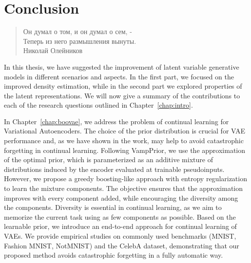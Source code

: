 \chapter{Conclusion}


\begin{quote}
\normalsize\itshape
\begin{flushright}
\foreignlanguage{russian}{Он думал о том, и он думал о сем, -}\\
\foreignlanguage{russian}{Теперь из него размышления вынуты.}  \\
\foreignlanguage{russian}{Николай Олейников} \\ \vskip 10pt
\end{flushright}
\end{quote}

In this thesis, we have suggested the improvement of latent variable generative models in different scenarios and aspects. In the first part, we focused on the improved density estimation, while in the second part we explored properties of the latent representations. 
We will now give a summary of the contributions to each of the research questions outlined in Chapter~\ref{chap:intro}.

In Chapter~\ref{chap:boovae}, we address the problem of continual learning for Variational Autoencoders. 
The choice of the prior distribution is crucial for VAE performance and, as we have shown in the work, may help to avoid catastrophic forgetting in continual learning. 
Following VampPrior, we use the approximation of the optimal prior, which is parameterized as an additive mixture of distributions induced by the encoder evaluated at trainable pseudoinputs. 
However, we propose a greedy boosting-like approach with entropy regularization to learn the mixture components. 
The objective ensures that the approximation improves with every component added, while encouraging the diversity among the components. 
Diversity is essential in continual learning, as we aim to memorize the current task using as few components as possible. 
Based on the learnable prior, we introduce an end-to-end approach for continual learning of VAEs. 
We provide empirical studies on commonly used benchmarks (MNIST, Fashion MNIST, NotMNIST) and the CelebA dataset, demonstrating that our proposed method avoids catastrophic forgetting in a fully automatic way.


